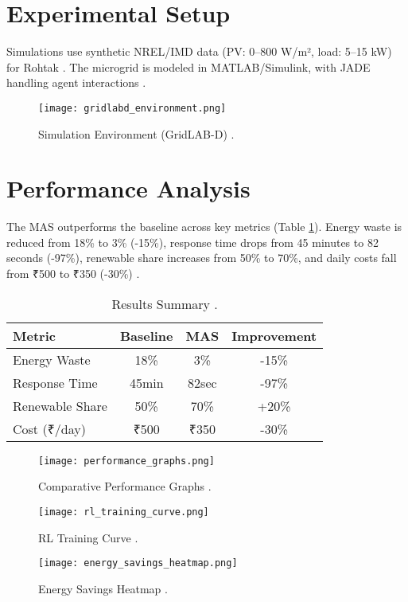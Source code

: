 \documentclass[12pt]{report}
\begin{document}
\section{Experimental Setup}
\begin{doublespace}
Simulations use synthetic NREL/IMD data (PV: 0–800 W/m², load: 5–15 kW) for Rohtak \cite{NREL2025}. The microgrid is modeled in MATLAB/Simulink, with JADE handling agent interactions \cite{MNRE2023}.
\end{doublespace}
\begin{figure}[h]
    \centering
    \texttt{[image: gridlabd\_environment.png]}
    \caption{Simulation Environment (GridLAB-D) \cite{GridLABD2024}.}
    \label{fig:gridlabd}
\end{figure}

\section{Performance Analysis}
\begin{doublespace}
The MAS outperforms the baseline across key metrics (Table \ref{tab:results_summary}). Energy waste is reduced from 18\% to 3\% (-15\%), response time drops from 45 minutes to 82 seconds (-97\%), renewable share increases from 50\% to 70\%, and daily costs fall from ₹500 to ₹350 (-30\%) \cite{MNRE2023}.
\end{doublespace}
\begin{table}[h]
    \centering
    \caption{Results Summary \cite{MNRE2023}.}
    \label{tab:results_summary}
    \begin{tabular}{lccc}
        \toprule
        \textbf{Metric} & \textbf{Baseline} & \textbf{MAS} & \textbf{Improvement} \\
        \midrule
        Energy Waste & 18\% & 3\% & -15\% \\
        Response Time & 45min & 82sec & -97\% \\
        Renewable Share & 50\% & 70\% & +20\% \\
        Cost (₹/day) & ₹500 & ₹350 & -30\% \\
        \bottomrule
    \end{tabular}
\end{table}
\begin{figure}[h]
    \centering
    \texttt{[image: performance\_graphs.png]}
    \caption{Comparative Performance Graphs \cite{MNRE2023}.}
    \label{fig:performance_graphs}
\end{figure}
\begin{figure}[h]
    \centering
    \texttt{[image: rl\_training\_curve.png]}
    \caption{RL Training Curve \cite{Zhou2021}.}
    \label{fig:rl_training}
\end{figure}
\begin{figure}[h]
    \centering
    \texttt{[image: energy\_savings\_heatmap.png]}
    \caption{Energy Savings Heatmap \cite{MNRE2023}.}
    \label{fig:energy_savings}
\end{figure}
\end{document}
